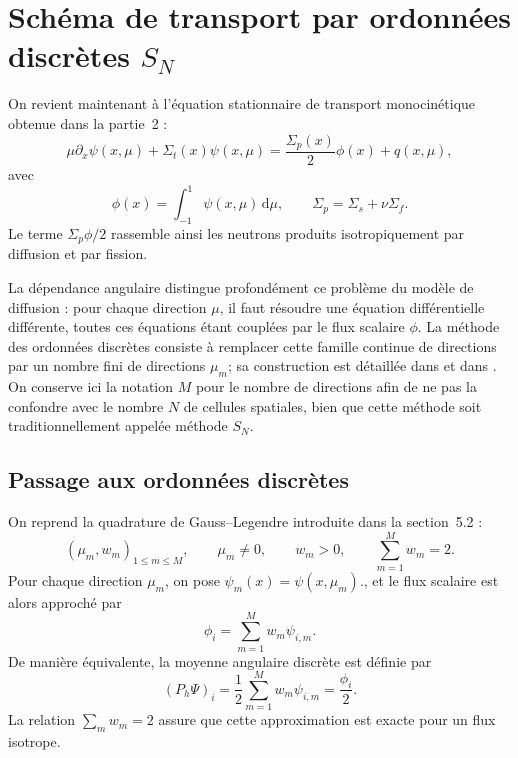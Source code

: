 \documentclass{article}
\begin{document}
\section {Schéma de transport par ordonnées discrètes $S_N$}
\label{subsec:schema-transport-SN}

On revient maintenant à l'équation stationnaire de transport monocinétique obtenue dans la partie~2 :
\begin{equation}
    \mu\partial_x\psi(x,\mu) + \Sigma_t(x)\psi(x,\mu)
    = \frac{\Sigma_p(x)}{2}\phi(x) + q(x,\mu),
    \label{eq:transport-stationnaire-continu}
\end{equation}
avec
\[
    \phi(x) = \int_{-1}^{1}\psi(x,\mu)\,\mathrm{d}\mu,
    \qquad
    \Sigma_p=\Sigma_s+\nu\Sigma_f.
\]
Le terme $\Sigma_p\phi/2$ rassemble ainsi les neutrons produits isotropiquement par diffusion et par fission.

La dépendance angulaire distingue profondément ce problème du modèle de diffusion : pour chaque direction $\mu$, il faut résoudre une équation différentielle différente, toutes ces équations étant couplées par le flux scalaire $\phi$. La méthode des ordonnées discrètes consiste à remplacer cette famille continue de directions par un nombre fini de directions $\mu_m$; sa construction est détaillée dans \cite[chap.~5, section~5.2]{Allaire2018} et dans \textcite{Lewis1984}. On conserve ici la notation $M$ pour le nombre de directions afin de ne pas la confondre avec le nombre $N$ de cellules spatiales, bien que cette méthode soit traditionnellement appelée méthode $S_N$.

\subsection {Passage aux ordonnées discrètes}

On reprend la quadrature de Gauss--Legendre introduite dans la
section~5.2 :
\[
    \left(\mu_m,w_m\right)_{1\leq m\leq M},
    \qquad \mu_m\neq0, \qquad w_m>0, \qquad
    \sum_{m=1}^{M}w_m=2.
\]
Pour chaque direction $\mu_m$, on pose $\psi_m(x)=\psi(x,\mu_m).$, et le flux scalaire est alors approché par
\begin{equation}
    \boxed{
        \phi_i = \sum_{m=1}^{M}w_m\psi_{i,m}.
    }
    \label{eq:flux-scalaire-SN}
\end{equation}
De manière équivalente, la moyenne angulaire discrète est définie par
\[
(P_h\Psi)_i = \frac12\sum_{m=1}^{M}w_m\psi_{i,m} = \frac{\phi_i}{2}.
\]
La relation $\sum_mw_m=2$ assure que cette approximation est exacte pour un flux isotrope.
\end{document}
